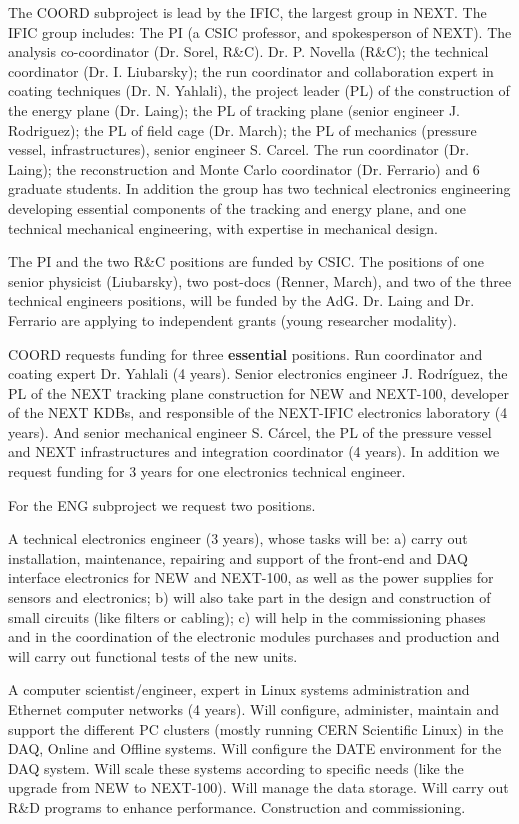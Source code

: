 The COORD subproject is lead by the IFIC, the largest group in NEXT. The IFIC group includes: The PI (a CSIC professor, and spokesperson of NEXT). The analysis co-coordinator (Dr. Sorel, R\&C). Dr. P. Novella (R\&C); the technical coordinator (Dr. I. Liubarsky); the run coordinator and collaboration expert in coating techniques (Dr. N. Yahlali), the project leader (PL) of the construction of the energy plane (Dr. Laing); the PL of tracking plane (senior engineer J. Rodriguez); the PL of field cage (Dr. March); the PL of mechanics (pressure vessel, infrastructures), senior engineer S. Carcel. The run coordinator (Dr. Laing); the reconstruction and Monte Carlo coordinator (Dr. Ferrario) and 6 graduate students. In addition the group has two technical electronics engineering developing essential components of the tracking and energy plane, and one technical mechanical engineering, with expertise in mechanical design. 

The PI and the two R\&C positions are funded by CSIC. The positions of one senior physicist (Liubarsky), two post-docs (Renner, March), and two of the three technical engineers positions, will be funded by the AdG. Dr. Laing and Dr. Ferrario are applying to independent grants (young researcher modality). 

COORD requests funding for three {\bf essential} positions. Run coordinator and coating expert Dr. Yahlali (4 years). Senior electronics engineer J. Rodríguez, the PL of the NEXT tracking plane construction for NEW and NEXT-100, developer of the NEXT KDBs, and responsible of the NEXT-IFIC electronics laboratory (4 years). And senior mechanical engineer S. Cárcel, the PL of the pressure vessel and NEXT infrastructures and integration coordinator (4 years). In addition we request funding for 3 years for one electronics technical engineer.  

For the ENG subproject we request two positions.

A technical electronics engineer (3 years), whose tasks will be: a) carry out installation, maintenance, repairing and support of the front-end and DAQ interface electronics for NEW and NEXT-100, as well as the power supplies for sensors and electronics; b) will also take part in the design and construction of small circuits (like filters or cabling); c) will help in the commissioning phases and in the coordination of the electronic modules purchases and production and will carry out functional tests of the new units. 

A computer scientist/engineer, expert in Linux systems administration and Ethernet computer networks (4 years). Will configure, administer, maintain and support the different PC clusters (mostly running CERN Scientific Linux) in the DAQ, Online and Offline systems. Will configure the DATE environment for the DAQ system. Will scale these systems according to specific needs (like the upgrade from NEW to NEXT-100). Will manage the data storage. Will carry out R\&D programs to enhance performance. Construction and commissioning. 

